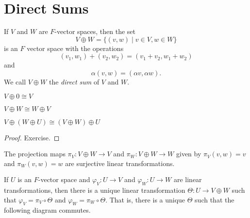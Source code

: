 \documentclass{memoir}
\begin{document}
\setcounter{section}{10}

\section{Direct Sums}

\begin{prp}
If $V$ and $W$ are $F$-vector spaces, then the set \[V \oplus W = \{(v,w) \mid v \in V, w \in W\}\] is an $F$ vector space with the operations \[ (v_1,w_1) + (v_2,w_2) = (v_1+v_2, w_1+w_2) \] and \[ \alpha(v,w) = (\alpha v, \alpha w). \] We call $V \oplus W$ the \emph{direct sum} of $V$ and $W$.
\end{prp}

\begin{prp} \mbox{}
\begin{enumerate*}
\item $V \oplus 0 \cong V$
\item $V \oplus W \cong W \oplus V$
\item $V \oplus (W \oplus U) \cong (V \oplus W) \oplus U$
\end{enumerate*}
\end{prp}

\begin{proof}
Exercise.
\end{proof}

\begin{prp} \mbox{}
\begin{enumerate*}
\item The projection maps $\pi_V : V \oplus W \rightarrow V$ and $\pi_W : V \oplus W \rightarrow W$ given by $\pi_V(v,w) = v$ and $\pi_W(v,w) = w$ are surjective linear transformations.
\item If $U$ is an $F$-vector space and $\varphi_V : U \rightarrow V$ and $\varphi_W : U \rightarrow W$ are linear transformations, then there is a unique linear transformation $\Theta : U \rightarrow V \oplus W$ such that $\varphi_V = \pi_V \circ \Theta$ and $\varphi_W = \pi_W \circ \Theta$. That is, there is a unique $\Theta$ such that the following diagram commutes.

\begin{center}
\end{center}
\end{enumerate*}
\end{prp}
\end{document}
